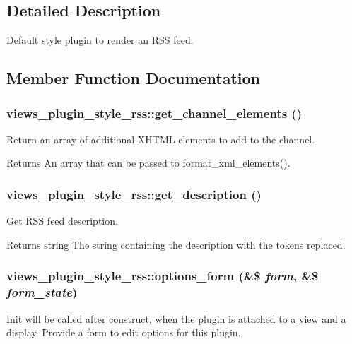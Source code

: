 \subsection{Detailed Description}
Default style plugin to render an RSS feed. 

\subsection{Member Function Documentation}
\hypertarget{classviews__plugin__style__rss_afce443c4f7053fc7e9a2043ae0848cd7}{
\subsubsection[{get\_\-channel\_\-elements}]{\setlength{\rightskip}{0pt plus 5cm}views\_\-plugin\_\-style\_\-rss::get\_\-channel\_\-elements ()}}
\label{classviews__plugin__style__rss_afce443c4f7053fc7e9a2043ae0848cd7}
Return an array of additional XHTML elements to add to the channel.

\begin{DoxyReturn}{Returns}
An array that can be passed to format\_\-xml\_\-elements(). 
\end{DoxyReturn}
\hypertarget{classviews__plugin__style__rss_a0f17316df765b758ead202868c44ebba}{
\subsubsection[{get\_\-description}]{\setlength{\rightskip}{0pt plus 5cm}views\_\-plugin\_\-style\_\-rss::get\_\-description ()}}
\label{classviews__plugin__style__rss_a0f17316df765b758ead202868c44ebba}
Get RSS feed description.

\begin{DoxyReturn}{Returns}
string The string containing the description with the tokens replaced. 
\end{DoxyReturn}
\hypertarget{classviews__plugin__style__rss_a317b1867ddd97f969977368031e04fee}{
\subsubsection[{options\_\-form}]{\setlength{\rightskip}{0pt plus 5cm}views\_\-plugin\_\-style\_\-rss::options\_\-form (\&\$ {\em form}, \/  \&\$ {\em form\_\-state})}}
\label{classviews__plugin__style__rss_a317b1867ddd97f969977368031e04fee}
Init will be called after construct, when the plugin is attached to a \hyperlink{classview}{view} and a display. Provide a form to edit options for this plugin. 

